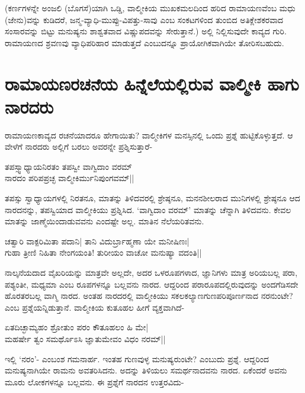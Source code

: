 (ಕರ್ಣಗಳನ್ನೇ ಅಂಜಲಿ (ಬೊಗಸೆ)ಯಾಗಿ ಒಡ್ಡಿ, ವಾಲ್ಮೀಕಿಯ ಮುಖಕಮಲದಿಂದ ಹರಿದ ರಾಮಾಯಣವೆಂಬ ಮಧು (ಜೇನು)ವನ್ನು ಕುಡಿದರೆ, ಜನ್ಮ-ವ್ಯಾಧಿ-ಮುಪ್ಪು-ವಿಪತ್ತು-ಸಾವು ಎಂಬ ಸಂಕಟಗಳಿಂದ ತುಂಬಿದ ಅತಿಕ್ಲೇಶಕರವಾದ ಸಂಸಾರವನ್ನು ಬಿಟ್ಟು ಮನುಷ್ಯನು ಶಾಶ್ವತವಾದ ವಿಷ್ಣುಪದವನ್ನು ಸೇರುತ್ತಾನೆ.) ಅಲ್ಲಿ ನಿಲ್ಲಿಸುವುದೇ ಕಾವ್ಯದ ಗುರಿ. ರಾಮಾಯಣದ ಶ್ರವಣವು ವ್ಯಾಧಿಪರಿಹಾರ ಮಾಡುತ್ತದೆ ಎಂಬುದನ್ನೂ ಪ್ರಾಯೋಗಿಕವಾಗಿಯೇ ತೋರಿಸಬಹುದು. 

\section*{ರಾಮಾಯಣರಚನೆಯ ಹಿನ್ನೆಲೆಯಲ್ಲಿರುವ ವಾಲ್ಮೀಕಿ ಹಾಗು ನಾರದರು} 

ರಾಮಾಯಣಕಾವ್ಯದ ರಚನೆಯಾದರೂ ಹೇಗಾಯಿತು? ವಾಲ್ಮೀಕಿಗಳ ಮನಸ್ಸಿನಲ್ಲಿ ಒಂದು ಪ್ರಶ್ನೆ ಹುಟ್ಟಿಕೊಳ್ಳುತ್ತದೆ. ಆ ವೇಳೆಗೆ ನಾರದರು ಅಲ್ಲಿಗೆ ಬರಲು ಅವರನ್ನೇ ಪ್ರಶ್ನಿಸುತ್ತಾರೆ- 

\begin{shloka} 
ತಪಸ್ಸ್ವಾಧ್ಯಾಯನಿರತಂ ತಪಸ್ವೀ ವಾಗ್ವಿದಾಂ ವರಮ್‍\label{153}\\ 
ನಾರದಂ ಪರಿಪಪ್ರಚ್ಛ ವಾಲ್ಮೀಕಿರ್ಮುನಿಪುಂಗವಮ್‍||
\end{shloka} 

ತಪಸ್ಸು ಸ್ವಾಧ್ಯಾಯಗಳಲ್ಲಿ ನಿರತನೂ, ಮಾತನ್ನು ತಿಳಿದವರಲ್ಲಿ ಶ್ರೇಷ್ಠನೂ, ಮನನಶೀಲರಾದ ಮುನಿಗಳಲ್ಲಿ ಶ್ರೇಷ್ಠನೂ ಆದ ನಾರದನನ್ನು, ತಪಸ್ವಿಯಾದ ವಾಲ್ಮೀಕಿಯು ಪ್ರಶ್ನಿಸಿದ. `ವಾಗ್ವಿದಾಂ ವರಮ್‍' ಮಾತನ್ನು ಚೆನ್ನಾಗಿ ತಿಳಿದವನು. ಕೇವಲ ಮಾತನ್ನು ಜಾಣ್ಮೆಯಿಂದಾಡುವವನು ಎಂದಷ್ಟೇ ಅಲ್ಲ. ಮಾತಿನ ನೆಲೆಯರಿತವನು. 

\begin{shloka} 
ಚತ್ವಾರಿ ವಾಕ್ಪರಿಮಿತಾ ಪದಾನಿ| ತಾನಿ ವಿದುರ್ಬ್ರಾಹ್ಮಣಾ ಯೇ ಮನೀಷಿಣಃ|\label{153}\\ 
ಗುಹಾ ತ್ರೀಣಿ ನಿಹಿತಾ ನೇಂಗಯಂತಿ! ತುರೀಯಂ ವಾಚೋ ಮನುಷ್ಯಾ  ವದಂತಿ||
\end{shloka} 

ನಾಲ್ಕನೆಯದಾದ ವೈಖರಿಯನ್ನು ಮಾತ್ರವೇ ಅಲ್ಲದೇ, ಅದರ ಒಳರೂಪಗಳಾದ, ಜ್ಞಾನಿಗಳು ಮಾತ್ರ ಅರಿಯಬಲ್ಲ ಪರಾ, ಪಶ್ಯಂತೀ, ಮಧ್ಯಮಾ ಎಂಬ ರೂಪಗಳನ್ನೂ ಬಲ್ಲವನು ನಾರದ. ಆದ್ದರಿಂದ ಪರಾರೂಪದಲ್ಲಿರುವುದನ್ನು ಅಂದಗೆಡಿಸದೇ ಹೊರತರಬಲ್ಲ ವಾಗ್ಮಿ ನಾರದ. ಅಂತಹ ನಾರದರಲ್ಲಿ ವಾಲ್ಮೀಕಿಯು ಸಕಲಕಲ್ಯಾಣಗುಣಪರಿಪೂರ್ಣನಾದ ನರನುಂಟೇ? ಎಂಬ ಪ್ರಶ್ನೆಯನ್ನಿಡುತ್ತಾನೆ. ವಾಲ್ಮೀಕಿಯ ಕುತೂಹಲ ಹೀಗೆ ವ್ಯಕ್ತವಾಗಿದೆ- 

\begin{shloka} 
ಏತದಿಚ್ಛಾಮ್ಯಹಂ ಶ್ರೋತುಂ ಪರಂ ಕೌತೂಹಲಂ ಹಿ ಮೇ|\label{153}\\ 
ಮಹರ್ಷೇ ತ್ವಂ ಸಮರ್ಥೊಽಸಿ ಜ್ಞಾತುಮೇವಂ ವಿಧಂ ನರಮ್‍||
\end{shloka} 

ಇಲ್ಲಿ `ನರಂ'- ಎಂಬಂಶ ಗಮನಾರ್ಹ. ಇಂತಹ ಗುಣವುಳ್ಳ ಮನುಷ್ಯರುಂಟೇ? ಎಂಬುದು ಪ್ರಶ್ನೆ. ಆದ್ದರಿಂದ ಮನುಷ್ಯನಾಗಿಯೇ ರಾಮನು ಅವತರಿಸಿದನು. ಅದನ್ನು ತಿಳಿಯಲು ಸಮರ್ಥನಾದವನು ನಾರದ. ಏಕೆಂದರೆ ಅವನು ಮೂರು ಲೋಕಗಳನ್ನೂ ಬಲ್ಲವನು. ಈ ಪ್ರಶ್ನೆಗೆ ನಾರದನ ಉತ್ತರವಿದು- 

